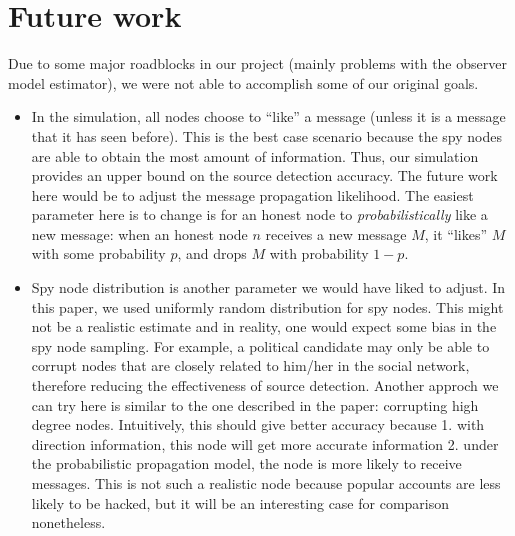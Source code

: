 \section{Future work}

Due to some major roadblocks in our project (mainly problems with the observer model estimator), we were not able to accomplish some of our original goals. 

\begin{itemize}

\item In the simulation, all nodes choose to ``like'' a message (unless it is a message that it has seen before). This is the best case scenario because the spy nodes are able to obtain the most amount of information. Thus, our simulation provides an upper bound on the source detection accuracy. The future work here would be to adjust the message propagation likelihood. The easiest parameter here is to change is for an honest node to \emph{probabilistically} like a new message: when an honest node $n$ receives a new message $M$, it ``likes'' $M$ with some probability $p$, and drops $M$ with probability $1-p$.

\item Spy node distribution is another parameter we would have liked to adjust. In this paper, we used uniformly random distribution for spy nodes. This might not be a realistic estimate and in reality, one would expect some bias in the spy node sampling. For example, a political candidate may only be able to corrupt nodes that are closely related to him/her in the social network, therefore reducing the effectiveness of source detection. Another approch we can try here is similar to the one described in the paper: corrupting high degree nodes. Intuitively, this should give better accuracy because 1. with direction information, this node will get more accurate information 2. under the probabilistic propagation model, the node is more likely to receive messages. This is not such a realistic node because popular accounts are less likely to be hacked, but it will be an interesting case for comparison nonetheless.

\end{itemize}
